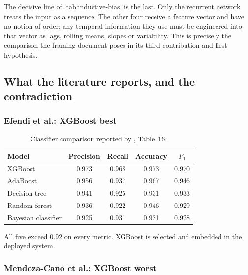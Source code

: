 \documentclass[12pt,a4paper,oneside]{report}
\begin{document}
The decisive line of \cref{tab:inductive-bias} is the last. Only the recurrent network treats the input as a sequence. The other four receive a feature vector and have no notion of order; any temporal information they use must be engineered into that vector as lags, rolling means, slopes or variability. This is precisely the comparison the framing document poses in its third contribution and first hypothesis.

\subsection{What the literature reports, and the contradiction}\label{sec:reported}

\subsubsection{Efendi et al.: XGBoost best}

\begin{table}[htbp]
\centering\small
\caption{Classifier comparison reported by \textcite{efendi2025}, Table~16.}\label{tab:efendi-models}
\begin{tabularx}{\textwidth}{@{}X c c c c@{}}
\toprule
\textbf{Model} & \textbf{Precision} & \textbf{Recall} & \textbf{Accuracy} & \textbf{$F_1$} \\
\midrule
XGBoost & 0.973 & 0.968 & 0.973 & 0.970 \\
AdaBoost & 0.956 & 0.937 & 0.967 & 0.946 \\
Decision tree & 0.941 & 0.925 & 0.931 & 0.933 \\
Random forest & 0.936 & 0.922 & 0.946 & 0.929 \\
Bayesian classifier & 0.925 & 0.931 & 0.931 & 0.928 \\
\bottomrule
\end{tabularx}
\end{table}

All five exceed 0.92 on every metric. XGBoost is selected and embedded in the deployed system.

\subsubsection{Mendoza-Cano et al.: XGBoost worst}
\end{document}
